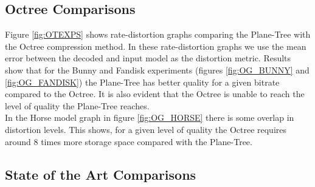 \subsection{Octree Comparisons}

Figure \ref{fig:OTEXPS} shows rate-distortion graphs comparing the Plane-Tree with the Octree compression method. In these rate-distortion graphs we use the mean error between the decoded and input model as the distortion metric. Results show that for the Bunny and Fandisk experiments (figures \ref{fig:OG_BUNNY} and \ref{fig:OG_FANDISK}) the Plane-Tree has better quality for a given bitrate compared to the Octree. It is also evident that the Octree is unable to reach the level of quality the Plane-Tree reaches. \\

In the Horse model graph in figure \ref{fig:OG_HORSE} there is some overlap in distortion levels. This shows, for a given level of quality the Octree requires around 8 times more storage space compared with the Plane-Tree. \\


\subsection{State of the Art Comparisons}

